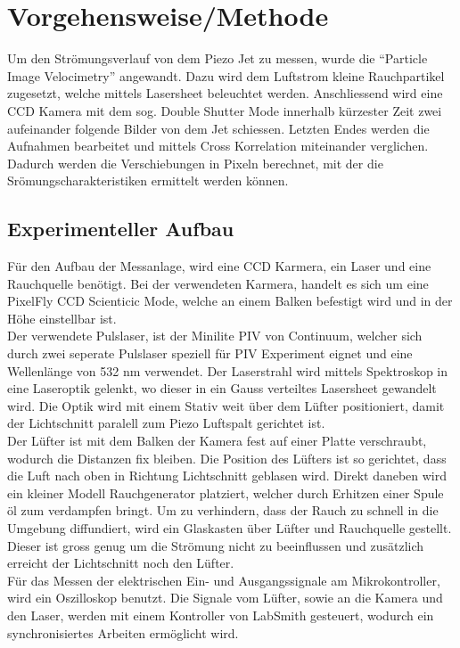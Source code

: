\chapter{Vorgehensweise/Methode}
Um den Strömungsverlauf von dem Piezo Jet zu messen, wurde die "`Particle Image Velocimetry"' angewandt. Dazu wird dem Luftstrom kleine Rauchpartikel zugesetzt, welche mittels Lasersheet beleuchtet werden. Anschliessend wird eine CCD Kamera mit dem sog. Double Shutter Mode innerhalb kürzester Zeit zwei aufeinander folgende Bilder von dem Jet schiessen. Letzten Endes werden die Aufnahmen bearbeitet und mittels Cross Korrelation miteinander verglichen. Dadurch werden die Verschiebungen in Pixeln berechnet, mit der die Srömungscharakteristiken ermittelt werden können.
\section{Experimenteller Aufbau}
Für den Aufbau der Messanlage, wird eine CCD Karmera, ein Laser und eine Rauchquelle benötigt. Bei der verwendeten Karmera, handelt es sich um eine PixelFly CCD Scienticic Mode, welche an einem Balken befestigt wird und in der Höhe einstellbar ist.\\
 Der verwendete Pulslaser, ist der Minilite PIV von Continuum, welcher sich durch zwei seperate Pulslaser speziell für PIV Experiment eignet  und eine Wellenlänge von 532 nm verwendet. Der Laserstrahl wird mittels Spektroskop in eine Laseroptik gelenkt, wo dieser in ein Gauss verteiltes Lasersheet gewandelt wird. Die Optik wird mit einem Stativ weit über dem Lüfter positioniert, damit der Lichtschnitt paralell zum Piezo Luftspalt gerichtet ist.\\
 Der Lüfter ist mit dem Balken der Kamera fest auf einer Platte verschraubt, wodurch die Distanzen fix bleiben. Die Position des Lüfters ist so gerichtet, dass die Luft nach oben in Richtung Lichtschnitt geblasen wird. Direkt daneben wird ein kleiner Modell Rauchgenerator platziert, welcher durch Erhitzen einer Spule öl zum verdampfen bringt. Um zu verhindern, dass der Rauch zu schnell in die Umgebung diffundiert, wird ein Glaskasten über Lüfter und Rauchquelle gestellt. Dieser ist gross genug um die Strömung nicht zu beeinflussen und zusätzlich erreicht der Lichtschnitt noch den Lüfter.\\
 Für das Messen der elektrischen Ein- und Ausgangssignale am Mikrokontroller, wird ein Oszilloskop benutzt. Die Signale vom Lüfter, sowie an die Kamera und den Laser, werden mit einem Kontroller von LabSmith gesteuert, wodurch ein synchronisiertes Arbeiten ermöglicht wird.
 
